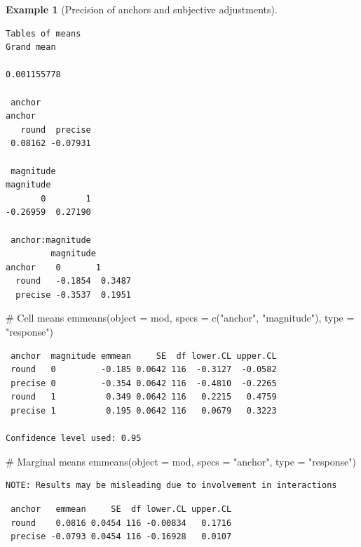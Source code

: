 \documentclass[
  11pt,
  letterpaper,
]{scrbook}
\newenvironment{Shaded}{\begin{snugshade}}{\end{snugshade}}
\newcommand{\AttributeTok}[1]{\textcolor[rgb]{0.40,0.45,0.13}{#1}}
\newcommand{\CommentTok}[1]{\textcolor[rgb]{0.37,0.37,0.37}{#1}}
\newcommand{\FunctionTok}[1]{\textcolor[rgb]{0.28,0.35,0.67}{#1}}
\newcommand{\NormalTok}[1]{\textcolor[rgb]{0.00,0.23,0.31}{#1}}
\newcommand{\StringTok}[1]{\textcolor[rgb]{0.13,0.47,0.30}{#1}}
\theoremstyle{definition}
\theoremstyle{definition}
\newtheorem{example}{Example}[chapter]
\theoremstyle{remark}
\begin{document}
\begin{example}[Precision of anchors and subjective
adjustments]
\begin{verbatim}
Tables of means
Grand mean
            
0.001155778 

 anchor 
anchor
   round  precise 
 0.08162 -0.07931 

 magnitude 
magnitude
       0        1 
-0.26959  0.27190 

 anchor:magnitude 
         magnitude
anchor    0       1      
  round   -0.1854  0.3487
  precise -0.3537  0.1951
\end{verbatim}

\begin{Shaded}
\begin{Highlighting}[]
\CommentTok{\# Cell means}
\FunctionTok{emmeans}\NormalTok{(}\AttributeTok{object =}\NormalTok{ mod, }
        \AttributeTok{specs =} \FunctionTok{c}\NormalTok{(}\StringTok{"anchor"}\NormalTok{, }\StringTok{"magnitude"}\NormalTok{),}
        \AttributeTok{type =} \StringTok{"response"}\NormalTok{)}
\end{Highlighting}
\end{Shaded}

\begin{verbatim}
 anchor  magnitude emmean     SE  df lower.CL upper.CL
 round   0         -0.185 0.0642 116  -0.3127  -0.0582
 precise 0         -0.354 0.0642 116  -0.4810  -0.2265
 round   1          0.349 0.0642 116   0.2215   0.4759
 precise 1          0.195 0.0642 116   0.0679   0.3223

Confidence level used: 0.95 
\end{verbatim}

\begin{Shaded}
\begin{Highlighting}[]
\CommentTok{\# Marginal means}
\FunctionTok{emmeans}\NormalTok{(}\AttributeTok{object =}\NormalTok{ mod, }
        \AttributeTok{specs =} \StringTok{"anchor"}\NormalTok{, }
        \AttributeTok{type =} \StringTok{"response"}\NormalTok{)}
\end{Highlighting}
\end{Shaded}

\begin{verbatim}
NOTE: Results may be misleading due to involvement in interactions
\end{verbatim}

\begin{verbatim}
 anchor   emmean     SE  df lower.CL upper.CL
 round    0.0816 0.0454 116 -0.00834   0.1716
 precise -0.0793 0.0454 116 -0.16928   0.0107


\end{verbatim}
\end{example}
\end{document}
